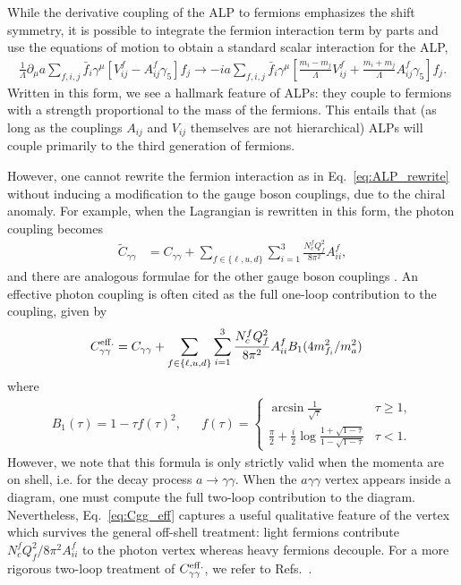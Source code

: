 {While the derivative coupling of the ALP to fermions emphasizes the shift symmetry, it is possible to integrate the fermion interaction term by parts and use the equations of motion to obtain a standard scalar interaction for the ALP,
\begin{align}
    \frac{1}{\Lambda}\partial_\mu a \sum_{f,i,j}\bar{f}_i\gamma^\mu\left[V_{ij}^f - A_{ij}^f \gamma_5\right]f_j \longrightarrow  -ia \sum_{f,i,j}\bar{f}_i\gamma^\mu\left[\frac{m_i - m_j}{\Lambda}V_{ij}^f + \frac{m_i + m_j}{\Lambda}A_{ij}^f \gamma_5\right]f_j.\label{eq:ALP_rewrite}
\end{align}
Written in this form, we see a hallmark feature of ALPs: they couple to fermions with a strength proportional to the mass of the fermions. This entails that (as long as the couplings $A_{ij}$ and $V_{ij}$ themselves are not hierarchical) ALPs will couple primarily to the third generation of fermions.

However, one cannot rewrite the fermion interaction as in Eq.~\ref{eq:ALP_rewrite} without inducing a modification to the gauge boson couplings, due to the chiral anomaly. For example, when the Lagrangian is rewritten in this form, the photon coupling becomes
\begin{align}
    \tilde{C}_{\gamma\gamma} &= C_{\gamma\gamma} + \sum_{f\in \{\ell, u, d\}}\sum_{i=1}^{3}\frac{N_c^fQ_f^2}{8\pi^2}A_{ii}^f, \label{eq:Cgg_eff}
\end{align}
and there are analogous formulae for the other gauge boson couplings \cite{Bauer:2021mvw}. An effective photon coupling is often cited as the full one-loop contribution to the coupling, given by
\begin{align}
    C_{\gamma\gamma}^{\rm eff.} &= C_{\gamma\gamma} + \sum_{f\in \{\ell, u, d\}}\sum_{i=1}^{3}\frac{N_c^fQ_f^2}{8\pi^2}A_{ii}^f B_1(4m_{f_i}^2 / m_a^2)
\end{align}
where
\begin{align}
    && B_1(\tau) = 1 - \tau f(\tau)^2, && f(\tau) = \begin{cases}\arcsin\frac{1}{\sqrt{\tau}}&\tau\geq1,\\\tfrac{\pi}{2}+\tfrac{i}{2}\log\frac{1+\sqrt{1-\tau}}{1-\sqrt{1-\tau}} & \tau < 1.\end{cases} && 
    \label{eq:B1}
\end{align}
However, we note that this formula is only strictly valid when the momenta are on shell, i.e. for the decay process $a\rightarrow \gamma\gamma$.  When the $a\gamma\gamma$ vertex appears inside a diagram, one must compute the full two-loop contribution to the diagram. Nevertheless, Eq.~\ref{eq:Cgg_eff} captures a useful qualitative feature of the vertex which survives the general off-shell treatment: light fermions contribute $N_c^f Q_f^2/8\pi^2 A_{ii}^f$ to the photon vertex whereas heavy fermions decouple. For a more rigorous two-loop treatment of $C_{\gamma\gamma}^{\rm eff.}$, we refer to Refs.~\cite{Buen-Abad:2021fwq,Neubert:2024jal}.

}
